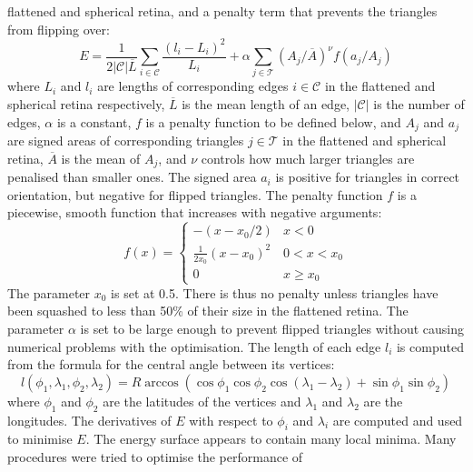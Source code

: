 \documentclass[10pt]{article}
\begin{document}
\begin{enumerate}
  flattened and spherical retina, and a penalty term that prevents the
  triangles from flipping over:
  \begin{equation}
    E = \frac{1}{2|\mathcal{C}|\overline{L}} \sum_{i\in\mathcal{C}} \frac{(l_i - L_i)^2}{L_i}  
    + \alpha\sum_{j\in\mathcal{T}} (A_j/\overline{A})^\nu f(a_j/A_j)
  \end{equation}
  where $L_i$ and $l_i$ are lengths of corresponding edges
  $i\in\mathcal{C}$ in the flattened and spherical retina
  respectively, $\overline{L}$ is the mean length of an edge,
  $|\mathcal{C}|$ is the number of edges, $\alpha$ is a constant, $f$
  is a penalty function to be defined below, and $A_j$ and $a_j$ are
  signed areas of corresponding triangles $j\in\mathcal{T}$ in the
  flattened and spherical retina, $\overline{A}$ is the mean of $A_j$,
  and $\nu$ controls how much larger triangles are penalised than
  smaller ones.  The signed area $a_i$ is positive for triangles in
  correct orientation, but negative for flipped triangles. The penalty
  function $f$ is a piecewise, smooth function that increases with
  negative arguments:
  \begin{equation}
    \label{retistruct_plos:eq:1}
    f(x) = \left\{
      \begin{array}{ll}
        -(x - x_{0}/2) & x < 0 \\
        \frac{1}{2x_0}(x - x_0)^2 & 0 < x <x_0 \\
        0 & x \ge x_0
      \end{array} \right.
  \end{equation}
  The parameter $x_0$ is set at 0.5. There is thus no penalty unless
  triangles have been squashed to less than 50\% of their size in the
  flattened retina.  The parameter $\alpha$ is set to be large enough
  to prevent flipped triangles without causing numerical problems with
  the optimisation. The length of each edge $l_i$ is computed from the
  formula for the central angle between its vertices:
  \begin{equation}
    \label{retistruct_plos:eq:2}
    l(\phi_1, \lambda_1, \phi_2, \lambda_2) =
    R\arccos(\cos\phi_1\cos\phi_2\cos(\lambda_1-\lambda_2) +
    \sin\phi_1\sin\phi_2)
  \end{equation}
  where $\phi_1$ and $\phi_2$ are the latitudes of the vertices and
  $\lambda_1$ and $\lambda_2$ are the longitudes.  The derivatives of
  $E$ with respect to $\phi_i$ and $\lambda_i$ are computed and used
  to minimise $E$. The energy surface appears to contain many local
  minima. Many procedures were tried to optimise the performance of

\end{enumerate}
\end{document}
